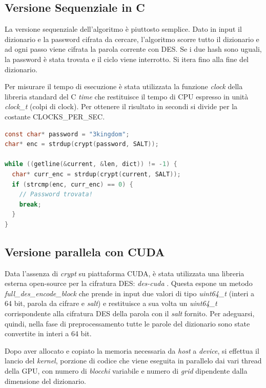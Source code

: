 \documentclass[10pt,twocolumn,letterpaper]{article}
\begin{document}
\subsection{Versione Sequenziale in C}
La versione sequenziale dell'algoritmo è piuttosto semplice. Dato in input il dizionario e la password cifrata da cercare, l'algoritmo scorre tutto il dizionario e ad ogni passo viene cifrata la parola corrente con DES. Se i due hash sono uguali, la password è stata trovata e il ciclo viene interrotto. Si itera fino alla fine del dizionario. 

Per misurare il tempo di esecuzione è stata utilizzata la funzione \textit{clock} della libreria standard del C \textit{time} che restituisce il tempo di CPU espresso in unità \textit{clock\_t} (colpi di clock). Per ottenere il risultato in secondi si divide per la costante CLOCKS\_PER\_SEC.
\newline

\begin{lstlisting}[basicstyle=\footnotesize, language=C, frame=single, caption={Esempio di ricerca sequenziale nel dizionario}, captionpos=b]
const char* password = "3kingdom";
char* enc = strdup(crypt(password, SALT));

while ((getline(&current, &len, dict)) != -1) {
  char* curr_enc = strdup(crypt(current, SALT));
  if (strcmp(enc, curr_enc) == 0) {
    // Password trovata!
    break;
  }
}
\end{lstlisting}

\subsection{Versione parallela con CUDA}
Data l'assenza di \textit{crypt} su piattaforma CUDA, è stata utilizzata una libreria esterna open-source per la cifratura DES: \textit{des-cuda} \cite{DES-CUDA}.
Questa espone un metodo \textit{full\_des\_encode\_block} che prende in input due valori di tipo \textit{uint64\_t} (interi a 64 bit, parola da cifrare e \textit{salt}) e restituisce a sua volta un \textit{uint64\_t} corrispondente alla cifratura DES della parola con il \textit{salt} fornito. Per adeguarsi, quindi, nella fase di preprocessamento tutte le parole del dizionario sono state convertite in interi a 64 bit. 

Dopo aver allocato e copiato la memoria necessaria da \textit{host} a \textit{device}, si effettua il lancio del \textit{kernel}, porzione di codice che viene eseguita in parallelo dai vari thread della GPU, con numero di \textit{blocchi} variabile e numero di \textit{grid} dipendente dalla dimensione del dizionario.
\newline
\end{document}
